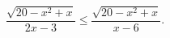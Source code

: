 \begin{ex}[type=inequality]
	\begin{condition}
		$ \dfrac{\sqrt{20 - x^2 + x}}{2x - 3}\leqslant\dfrac{\sqrt{20 - x^2 + x}}{x - 6}.$
	\end{condition}
	\answer{$ x \in\{-4;5\}\cup[-3;1,5).$}
\end{ex}
